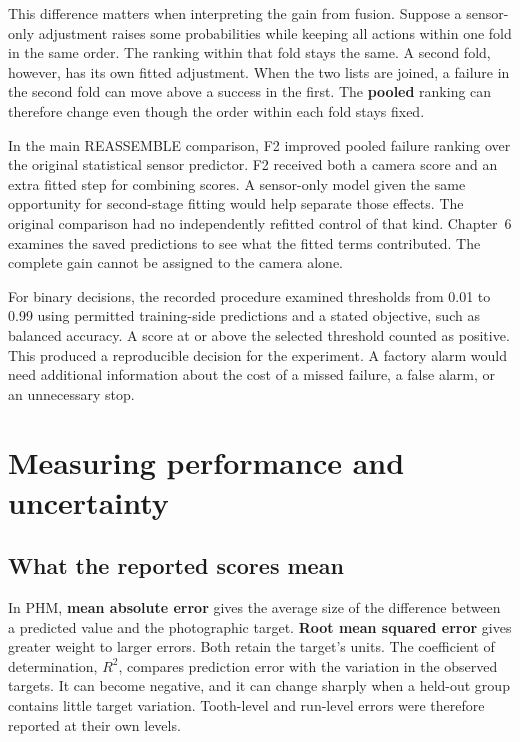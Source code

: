 This difference matters when interpreting the gain from fusion. Suppose a sensor-only
adjustment raises some probabilities while keeping all actions within one fold in the
same order. The ranking within that fold stays the same. A second fold, however, has its
own fitted adjustment. When the two lists are joined, a failure in the second fold can
move above a success in the first. The \textbf{pooled} ranking can therefore change even
though the order within each fold stays fixed.

In the main REASSEMBLE comparison, F2 improved pooled failure ranking over the original
statistical sensor predictor. F2 received both a camera score and an extra fitted step
for combining scores. A sensor-only model given the same opportunity for second-stage
fitting would help separate those effects. The original comparison had no independently
refitted control of that kind. Chapter~6 examines the saved predictions to see what the
fitted terms contributed. The complete gain cannot be assigned to the camera alone.

For binary decisions, the recorded procedure examined thresholds from 0.01 to 0.99 using
permitted training-side predictions and a stated objective, such as balanced accuracy. A
score at or above the selected threshold counted as positive. This produced a
reproducible decision for the experiment. A factory alarm would need additional
information about the cost of a missed failure, a false alarm, or an unnecessary stop.

\section{Measuring performance and uncertainty}
\label{sec:ch4-metrics}

\subsection{What the reported scores mean}

In PHM, \textbf{mean absolute error} gives the average size of the difference between a
predicted value and the photographic target. \textbf{Root mean squared error} gives
greater weight to larger errors. Both retain the target’s units. The coefficient of
determination, \(R^2\), compares prediction error with the variation in the observed
targets. It can become negative, and it can change sharply when a held-out group
contains little target variation. Tooth-level and run-level errors were therefore
reported at their own levels.

